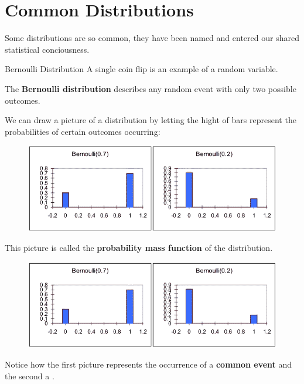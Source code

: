 \section{Common Distributions}

\begin{frame}
Some distributions are so common, they have been named and entered our shared
statistical conciousness.
\end{frame}
%

%
\begin{frame}{Bernoulli Distribution}
A single coin flip is an example of a  random
variable.

\hfill

The \textbf{Bernoulli distribution} describes any random event with only two possible
outcomes.
\end{frame}
%

%
\begin{frame}

We can draw a picture of a distribution by letting the hight of bars represent
the probabilities of certain outcomes occurring:

  \begin{figure}
    \includegraphics[scale=0.40]{bernoulli}
  \end{figure}

This picture is called the \textbf{probability mass function} of the
distribution.
\end{frame}
%

%
\begin{frame}

  \begin{figure}
    \includegraphics[scale=0.40]{bernoulli}
  \end{figure}

Notice how the first picture represents the occurrence of a \textbf{common event}
and the second a .

\end{frame}
%

